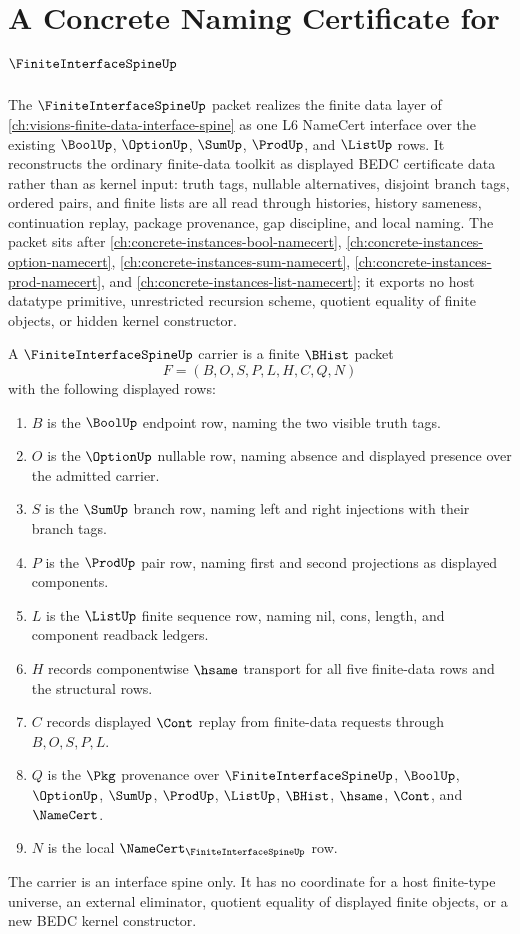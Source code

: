 \chapter{A Concrete Naming Certificate for $\FiniteInterfaceSpineUp$}
\label{ch:concrete-instances-finite-interface-spine-namecert}

The $\FiniteInterfaceSpineUp$ packet realizes the finite data layer of \autoref{ch:visions-finite-data-interface-spine} as one L6 NameCert interface over the existing $\BoolUp$, $\OptionUp$, $\SumUp$, $\ProdUp$, and $\ListUp$ rows. It reconstructs the ordinary finite-data toolkit as displayed BEDC certificate data rather than as kernel input: truth tags, nullable alternatives, disjoint branch tags, ordered pairs, and finite lists are all read through histories, history sameness, continuation replay, package provenance, gap discipline, and local naming. The packet sits after \autoref{ch:concrete-instances-bool-namecert}, \autoref{ch:concrete-instances-option-namecert}, \autoref{ch:concrete-instances-sum-namecert}, \autoref{ch:concrete-instances-prod-namecert}, and \autoref{ch:concrete-instances-list-namecert}; it exports no host datatype primitive, unrestricted recursion scheme, quotient equality of finite objects, or hidden kernel constructor.

\begin{definition}
\label{def:finite-interface-spine-carrier}
A $\FiniteInterfaceSpineUp$ carrier is a finite $\BHist$ packet
$$
F=(B,O,S,P,L,H,C,Q,N)
$$
with the following displayed rows:
\begin{enumerate}
\item $B$ is the $\BoolUp$ endpoint row, naming the two visible truth tags.
\item $O$ is the $\OptionUp$ nullable row, naming absence and displayed presence over the admitted carrier.
\item $S$ is the $\SumUp$ branch row, naming left and right injections with their branch tags.
\item $P$ is the $\ProdUp$ pair row, naming first and second projections as displayed components.
\item $L$ is the $\ListUp$ finite sequence row, naming nil, cons, length, and component readback ledgers.
\item $H$ records componentwise $\hsame$ transport for all five finite-data rows and the structural rows.
\item $C$ records displayed $\Cont$ replay from finite-data requests through $B,O,S,P,L$.
\item $Q$ is the $\Pkg$ provenance over $\FiniteInterfaceSpineUp$, $\BoolUp$, $\OptionUp$, $\SumUp$, $\ProdUp$, $\ListUp$, $\BHist$, $\hsame$, $\Cont$, and $\NameCert$.
\item $N$ is the local $\NameCert_{\FiniteInterfaceSpineUp}$ row.
\end{enumerate}
The carrier is an interface spine only. It has no coordinate for a host finite-type universe, an external eliminator, quotient equality of displayed finite objects, or a new BEDC kernel constructor.
\end{definition}

